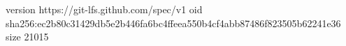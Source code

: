 version https://git-lfs.github.com/spec/v1
oid sha256:ec2b80c31429db5e2b446fa6bc4ffeea550b4cf4abb87486f823505b62241e36
size 21015
